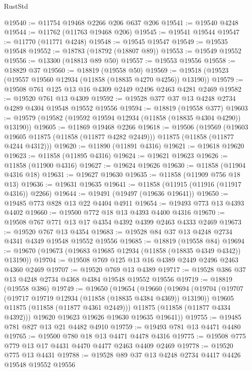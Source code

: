 \begin{lexlean}{RustStd}
\begin{coremodule}
@19540 := @11754 @19468 @2266 @206 @637 @206
@19541 := @19540 @4248
@19544 := @11762 (@11763 @19468 @206)
@19545 := @19541 @19544
@19547 := @11770 (@11771 @4248)
@19548 := @19545 @19547
@19549 := @19535 @19548
@19552 := @18783 (@18792 (@18807 @89))
@19553 := @19549 @19552
@19556 := @13300 (@18813 @89 @50)
@19557 := @19553 @19556
@19558 := @18829 @37
@19560 := @18819 (@19558 @50)
@19569 := @19518 (@19523 (@19557 @19560 @12934 (@11858 (@18835 @4270 @4256)) @13190))
@19579 := @19508 @761 @125 @13 @16 @4309 @2449 @2496 @2463 @4281 @2469
@19582 := @19520 @761 @13 @4309
@19592 := @19528 @377 @37 @13 @4248 @2734 @4289 @4304 @19548 @19552 @19556
@19594 := @18819 (@19558 @377)
@19603 := @19579 (@19582 (@19592 @19594 @12934 (@11858 (@18835 @4304 @4290)) @13190))
@19605 := @11869 @19468 @2266
@19618 := @19506
    (@19569
      (@19603 @19605 @11875 (@11858 (@11877 @4282 @2449)))
      @11875
      (@11858 (@11877 @4244 @4312)))
@19620 := @11890 (@11891 @4316)
@19621 := @19618 @19620
@19623 := @11858 (@11895 @4316)
@19624 := @19621 @19623
@19626 := @11858 (@11900 @4316)
@19627 := @19624 @19626
@19630 := @11858 (@11904 @4316 @18)
@19631 := @19627 @19630
@19635 := @11858 (@11909 @756 @18 @13)
@19636 := @19631 @19635
@19641 := @11858 (@11915 (@11916 (@11917 @4316)) @2266)
@19644 := @19491 (@19497 (@19636 @19641))
@19650 := @19485 @773 @828 @13 @22 @4404 @4911
@19654 := @19493 @773 @13 @4393 @4402
@19660 := @19500 @772 @18 @13 @4393 @4400 @4316
@19670 := @19508 @767 @771 @13 @17 @4354 @4392 @4399 @2463 @4333 @2469
@19673 := @19520 @767 @13 @4354
@19683 := @19528 @84 @37 @13 @4248 @2734 @4341 @4349 @19548 @19552 @19556
@19685 := @18819 (@19558 @84)
@19694 := @19670 (@19673 (@19683 @19685 @12934 (@11858 (@18835 @4349 @4342)) @13190))
@19704 := @19508 @769 @125 @13 @16 @4389 @2449 @2496 @2463 @4360 @2469
@19707 := @19520 @769 @13 @4389
@19717 := @19528 @386 @37 @13 @4248 @2734 @4368 @4384 @19548 @19552 @19556
@19719 := @18819 (@19558 @386)
@19749 := @19650
    (@19654
      (@19660
        (@19694
          (@19704
            (@19707 (@19717 @19719 @12934 (@11858 (@18835 @4384 @4369)) @13190))
            @19605
            @11875
            (@11858 (@11877 @4361 @2449)))
          @11875
          (@11858 (@11877 @4334 @4392)))
        @19620
        @19623
        @19626
        @19630
        @19635
        @19641))
@19755 := @19485 @781 @827 @13 @21 @4482 @4910
@19759 := @19493 @781 @13 @4471 @4480
@19765 := @19500 @780 @18 @13 @4471 @4478 @4316
@19775 := @19508 @775 @779 @13 @17 @4431 @4470 @4477 @2463 @4409 @2469
@19778 := @19520 @775 @13 @4431
@19788 := @19528 @89 @37 @13 @4248 @2734 @4417 @4426 @19548 @19552 @19556

\end{coremodule}
\end{lexlean}
